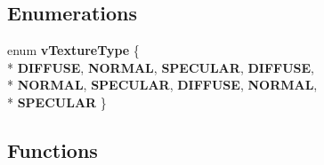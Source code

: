 \subsection*{Enumerations}
\begin{DoxyCompactItemize}
\item 
enum {\bfseries v\-Texture\-Type} \{ \\*
{\bfseries D\-I\-F\-F\-U\-S\-E}, 
{\bfseries N\-O\-R\-M\-A\-L}, 
{\bfseries S\-P\-E\-C\-U\-L\-A\-R}, 
{\bfseries D\-I\-F\-F\-U\-S\-E}, 
\\*
{\bfseries N\-O\-R\-M\-A\-L}, 
{\bfseries S\-P\-E\-C\-U\-L\-A\-R}, 
{\bfseries D\-I\-F\-F\-U\-S\-E}, 
{\bfseries N\-O\-R\-M\-A\-L}, 
\\*
{\bfseries S\-P\-E\-C\-U\-L\-A\-R}
 \}
\end{DoxyCompactItemize}
\subsection*{Functions}
